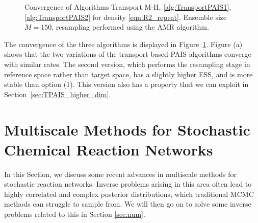 \documentclass[final]{siamltex}
\begin{document}
\begin{figure}[!ht]
\centering
{}
\caption{Convergence of Algorithms Transport M-H,
  \ref{alg:TransportPAIS1}, \ref{alg:TransportPAIS2} for density \eqref{eqn:R2_repeat}. Ensemble size $M=150$, resampling performed using the AMR algorithm.}
\label{fig:R2_l2_convergence}
\end{figure}

The convergence of the three algorithms is displayed in Figure~\ref{fig:R2_l2_convergence}. Figure (a) shows that the two variations of the transport based PAIS algorithms converge with similar rates. The second version, which performs the resampling stage in reference space rather than target space, has a slightly higher ESS, and is more stable than option (1). This version also has a property that we can exploit in Section~\ref{sec:TPAIS_higher_dim}.



\section{Multiscale Methods for Stochastic Chemical Reaction
  Networks}\label{sec:multi}
In this Section, we discuss some recent advances in multiscale methods
for stochastic reaction networks. Inverse problems arising in this
area often lead to highly correlated and complex posterior
distributions, which traditional MCMC methods can struggle to sample
from. We will then go on to solve some inverse problems related to
this in Section \ref{sec:num}.
\end{document}
